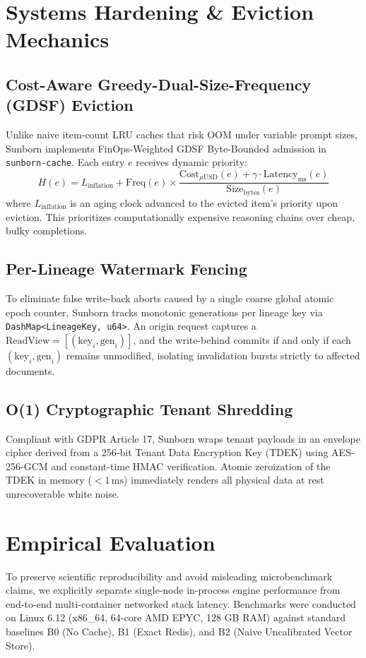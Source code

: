 \documentclass[sigconf,screen=true]{acmart}
\begin{document}
\section{Systems Hardening \& Eviction Mechanics}
\subsection{Cost-Aware Greedy-Dual-Size-Frequency (GDSF) Eviction}
Unlike naive item-count LRU caches that risk OOM under variable prompt sizes, Sunborn implements FinOps-Weighted GDSF Byte-Bounded admission in \texttt{sunborn-cache}. Each entry $e$ receives dynamic priority:
\begin{equation}
    H(e) = L_{\text{inflation}} + \text{Freq}(e) \times \frac{\text{Cost}_{\mu\text{USD}}(e) + \gamma \cdot \text{Latency}_{\text{ms}}(e)}{\text{Size}_{\text{bytes}}(e)}
\end{equation}
where $L_{\text{inflation}}$ is an aging clock advanced to the evicted item's priority upon eviction. This prioritizes computationally expensive reasoning chains over cheap, bulky completions.

\subsection{Per-Lineage Watermark Fencing}
To eliminate false write-back aborts caused by a single coarse global atomic epoch counter, Sunborn tracks monotonic generations per lineage key via \texttt{DashMap<LineageKey, u64>}. An origin request captures a $\text{ReadView} = [(\text{key}_i, \text{gen}_i)]$, and the write-behind commits if and only if each $(\text{key}_i, \text{gen}_i)$ remains unmodified, isolating invalidation bursts strictly to affected documents.

\subsection{O(1) Cryptographic Tenant Shredding}
Compliant with GDPR Article 17, Sunborn wraps tenant payloads in an envelope cipher derived from a 256-bit Tenant Data Encryption Key (TDEK) using AES-256-GCM and constant-time HMAC verification. Atomic zeroization of the TDEK in memory ($<1\,\text{ms}$) immediately renders all physical data at rest unrecoverable white noise.

\section{Empirical Evaluation}
To preserve scientific reproducibility and avoid misleading microbenchmark claims, we explicitly separate single-node in-process engine performance from end-to-end multi-container networked stack latency. Benchmarks were conducted on Linux 6.12 (x86\_64, 64-core AMD EPYC, 128 GB RAM) against standard baselines B0 (No Cache), B1 (Exact Redis), and B2 (Naive Uncalibrated Vector Store).
\end{document}
